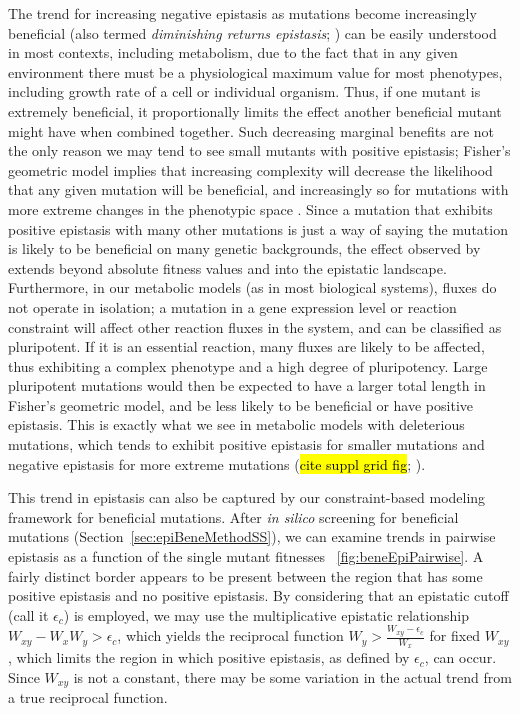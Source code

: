 The trend for increasing negative epistasis as mutations become
increasingly beneficial (also termed \textit{diminishing returns
epistasis}; \citep{Chou2011}) can be easily understood in most
contexts, including metabolism, due to the fact that in any given
environment there must be a physiological maximum value for most
phenotypes, including growth rate of a cell or individual organism.
Thus, if one mutant is extremely beneficial, it proportionally limits
the effect another beneficial mutant might have when combined
together. Such decreasing marginal benefits are not the only reason we
may tend to see small mutants with positive epistasis; Fisher's
geometric model implies that increasing complexity will decrease the
likelihood that any given mutation will be beneficial, and
increasingly so for mutations with more extreme changes in the
phenotypic space \citep{Orr2000}. Since a mutation that exhibits
positive epistasis with many other mutations is just a way of saying
the mutation is likely to be beneficial on many genetic backgrounds,
the effect observed by \citet{Orr2000} extends beyond absolute fitness
values and into the epistatic landscape. Furthermore, in our
metabolic models (as in most biological systems), fluxes do not
operate in isolation; a mutation in a gene expression level or
reaction constraint will affect other reaction fluxes in the system,
and can be classified as pluripotent. If it is an essential reaction,
many fluxes are likely to be affected, thus exhibiting a complex
phenotype and a high degree of pluripotency. Large pluripotent
mutations would then be expected to have a larger total length in
Fisher's geometric model, and be less likely to be beneficial or have
positive epistasis.  This is exactly what we see in metabolic models
with deleterious mutations, which tends to exhibit positive epistasis
for smaller mutations and negative epistasis for more extreme
mutations (\hl{cite suppl grid fig}; \citep{He2010, Xu2012}).


This trend in epistasis can also be captured by our constraint-based
modeling framework for beneficial mutations. After \textit{in silico}
screening for beneficial mutations
(Section~\ref{sec:epiBeneMethodSS}), we can examine trends in
pairwise epistasis as a function of the single mutant fitnesses 
\Fig~\ref{fig:beneEpiPairwise}. A fairly distinct border appears
to be present between the region that has some positive epistasis and
no positive epistasis. By considering that an epistatic cutoff (call
it $\epsilon_c$) is employed, we may use the multiplicative epistatic
relationship $W_{xy} - W_x W_y > \epsilon_c$, which yields the
reciprocal function $W_y > \frac{W_{xy} - \epsilon_c}{W_x}$ for fixed
$W_{xy}$, which limits the region in which positive epistasis, as
defined by $\epsilon_c$, can occur. Since $W_{xy}$ is not a constant,
there may be some variation in the actual trend from a true reciprocal
function.

